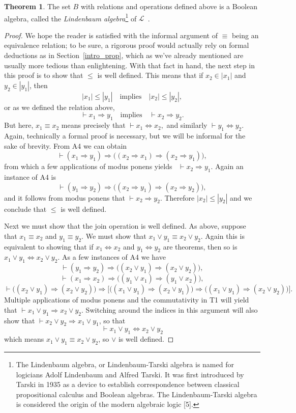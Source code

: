 \documentclass[11pt,titlepage]{article}
\newcommand{\imp}{\Rightarrow}
\newcommand{\ifff}{\Leftrightarrow}
\theoremstyle{definition}
\newtheorem{theorem}[definition]{Theorem}
\begin{document}
\begin{theorem}The set $B$ with relations and operations defined above is a Boolean algebra, called the \emph{Lindenbaum algebra}\footnote{The Lindenbaum algebra, or Lindenbaum-Tarski algebra is named for logicians Adolf Lindenbaum and Alfred Tarski. It was first introduced by Tarski in 1935 as a device to establish correspondence between classical propositional calculus and Boolean algebras. The Lindenbaum-Tarski algebra is considered the origin of the modern algebraic logic [5].} of $\mathcal{L}$~\cite{Bell}. \end{theorem}
\begin{proof} We hope the reader is satisfied with the informal argument of $\equiv$ being an equivalence relation; to be sure, a rigorous proof would actually rely on formal deductions as in Section~\ref{intro_prop}, which as we've already mentioned are usually more tedious than enlightening. With that fact in hand, the next step in this proof is to show that $\leq$ is well defined. This means that if $x_2 \in |x_1|$ and $y_2\in |y_1|$, then $$|x_1|\leq |y_1|\quad\text{implies}\quad|x_2|\leq|y_2|,$$ or as we defined the relation above, $$\vdash x_1\imp y_1 \quad\text{implies}\quad \vdash x_2\imp y_2.$$ But here, $x_1 \equiv x_2$ means precisely that $\vdash x_1 \ifff x_2,$ and similarly $\vdash y_1 \ifff y_2.$ Again, technically a formal proof is necessary, but we will be informal for the sake of brevity. From A4 we can obtain $$\vdash(x_1\imp y_1) \imp \big( (x_2\imp x_1)\imp (x_2\imp y_1) \big),$$ from which a few applications of modus ponens yields \ $\vdash x_2 \imp y_1.$ Again an instance of A4 is $$\vdash (y_1\imp y_2)\imp \big( (x_2\imp y_1 ) \imp (x_2\imp y_2)\big),$$ and it follows from modus ponens that $\vdash x_2\imp y_2$. Therefore $|x_2|\leq |y_2|$ and we conclude that $\leq$ is well defined.

Next we must show that the join operation is well defined. As above, suppose that $x_1\equiv x_2$ and $y_1\equiv y_2.$ We must show that $x_1\lor y_1 \equiv x_2\lor y_2.$ Again this is equivalent to showing that if $x_1\ifff x_2$ and $y_1\ifff y_2$ are theorems, then so is $x_1\lor y_1 \ifff x_2\lor y_2.$ As a few instances of A4 we have $$\vdash(y_1\imp y_2) \imp \big( (x_2 \lor y_1) \imp (x_2\lor y_2)\big),$$$$\vdash(x_1\imp x_2)\imp \big((y_1\lor x_1)\imp (y_1\lor x_2)\big),$$$$\vdash\big( (x_2 \lor y_1) \imp (x_2\lor y_2)\big) \imp\big[ \big((x_1\lor y_1)\imp (x_2\lor y_1)\big) \imp\big((x_1\lor y_1)\imp (x_2\lor y_2)\big)\big].$$  Multiple applications of modus ponens and the commutativity in T1 will yield that $\vdash x_1\lor y_1 \imp x_2\lor y_2$. Switching around the indices in this argument will also show that $\vdash x_2\lor y_2 \imp x_1\lor y_1$, so that $$\vdash x_1\lor y_1 \ifff x_2\lor y_2$$ which means $x_1 \lor y_1 \equiv x_2\lor y_2$, so $\lor$ is well defined.



\end{proof}
\end{document}
